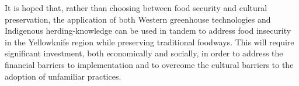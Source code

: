 \documentclass{report}
\begin{document}
\hspace{24pt} It is hoped that, rather than choosing between food security and cultural preservation, the application of both Western greenhouse technologies and Indigenous herding-knowledge can be used in tandem to address food insecurity in the Yellowknife region while preserving traditional foodways.
This will require significant investment, both economically and socially, in order to address the financial barriers to implementation and to overcome the cultural barriers to the adoption of unfamiliar practices.

\clearpage

\printbibliography[heading=bibintoc]
\end{document}

